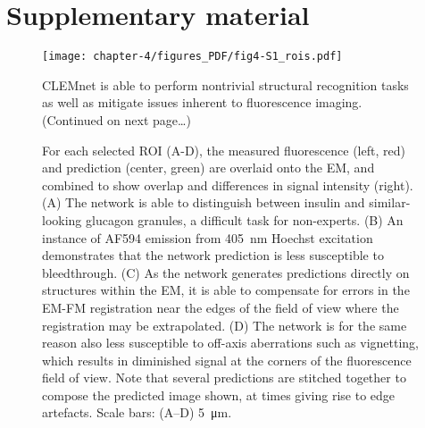 \clearpage
\section{Supplementary material}
\label{sec:4_supplement}
\renewcommand{\thefigure}{S\arabic{figure}}
\setcounter{figure}{0}    

\begin{figure}[!tbh]
    \centering
    \texttt{[image: chapter-4/figures\_PDF/fig4-S1\_rois.pdf]}
    \caption{CLEMnet is able to perform nontrivial structural recognition tasks as well as mitigate issues inherent to fluorescence imaging. (Continued on next page\ldots)}
    \label{fig:4.S1_rois}
\end{figure}
\addtocounter{figure}{-1}
\begin{figure}
    \caption{For each selected ROI (A-D), the measured fluorescence (left, red) and prediction (center, green) are overlaid onto the EM, and combined to show overlap and differences in signal intensity (right).
    (A) The network is able to distinguish between insulin and similar-looking glucagon granules, a difficult task for non-experts.
    (B) An instance of AF594 emission from \SI{405}{\nano\meter} Hoechst excitation demonstrates that the network prediction is less susceptible to bleedthrough. 
    (C) As the network generates predictions directly on structures within the EM, it is able to compensate for errors in the EM-FM registration near the edges of the field of view where the registration may be extrapolated.
    (D) The network is for the same reason also less susceptible to off-axis aberrations such as vignetting, which results in diminished signal at the corners of the fluorescence field of view.
    Note that several predictions are stitched together to compose the predicted image shown, at times giving rise to edge artefacts.
    Scale bars: (A--D) \SI{5}{\micro\meter}.}
\end{figure}

\quad